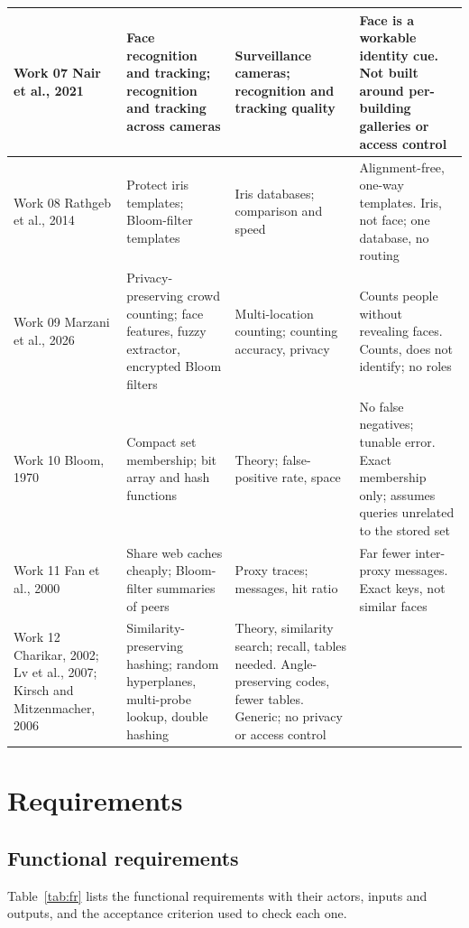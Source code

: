 \documentclass[12pt,a4paper,oneside]{report}
\begin{document}
{\begin{longtable}{|p{2.0cm}|p{3.8cm}|p{3.2cm}|p{5.1cm}|}
Work 07 \cite{ref8} Nair et al., 2021 & Face recognition and tracking; recognition and tracking across cameras & Surveillance cameras; recognition and tracking quality & Face is a workable identity cue. Not built around per-building galleries or access control\\\hline
Work 08 \cite{ref10} Rathgeb et al., 2014 & Protect iris templates; Bloom-filter templates & Iris databases; comparison and speed & Alignment-free, one-way templates. Iris, not face; one database, no routing\\\hline
Work 09 \cite{ref11} Marzani et al., 2026 & Privacy-preserving crowd counting; face features, fuzzy extractor, encrypted Bloom filters & Multi-location counting; counting accuracy, privacy & Counts people without revealing faces. Counts, does not identify; no roles\\\hline
Work 10 \cite{ref12} Bloom, 1970 & Compact set membership; bit array and hash functions & Theory; false-positive rate, space & No false negatives; tunable error. Exact membership only; assumes queries unrelated to the stored set\\\hline
Work 11 \cite{ref13} Fan et al., 2000 & Share web caches cheaply; Bloom-filter summaries of peers & Proxy traces; messages, hit ratio & Far fewer inter-proxy messages. Exact keys, not similar faces\\\hline
Work 12 \cite{ref14,ref15,ref16} Charikar, 2002; Lv et al., 2007; Kirsch and Mitzenmacher, 2006 & Similarity-preserving hashing; random hyperplanes, multi-probe lookup, double hashing & Theory, similarity search; recall, tables needed. Angle-preserving codes, fewer tables. Generic; no privacy or access control\\\hline
\end{longtable}}

\clearpage
\chapter{Requirements}
\section{Functional requirements}
Table~\ref{tab:fr} lists the functional requirements with their actors, inputs and outputs, and the acceptance criterion used to check each one.
\end{document}
